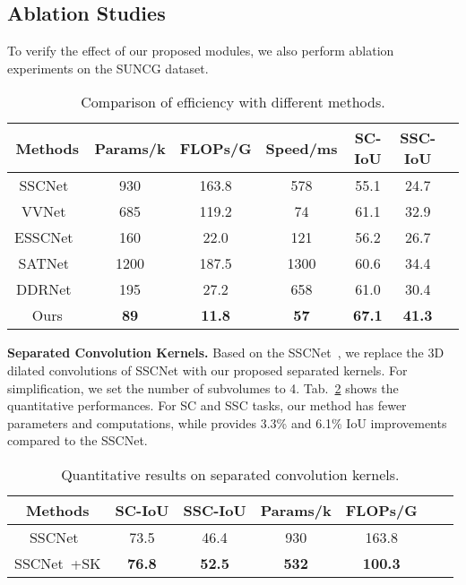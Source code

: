 \documentclass[10pt,twocolumn,letterpaper]{article}
\begin{document}
\subsection{Ablation Studies}
To verify the effect of our proposed modules, we also perform ablation experiments on
the SUNCG dataset.
\begin{table}
\begin{center}
\doublerulesep=0.5pt
\resizebox{0.48\textwidth}{!}
{
\begin{tabular}{|c|c|c|c|c|c|c}
\hline
Methods &Params/k&FLOPs/G&Speed/ms&SC-IoU&SSC-IoU\\
\hline
\hline
SSCNet~\cite{song2017semantic}&930&163.8&578& 55.1& 24.7 \\
VVNet~\cite{guo2018view}&685&119.2&74& 61.1& 32.9\\
ESSCNet~\cite{zhang2018efficient}&160&22.0&121& 56.2&26.7\\
SATNet~\cite{liu2018see}&1200&187.5&1300& 60.6& 34.4\\
DDRNet~\cite{li2019rgbd}&195&27.2&658& 61.0& 30.4\\
Ours&\textbf{89}&\textbf{11.8}&\textbf{57}& \textbf{67.1}& \textbf{41.3}\\
\hline
\end{tabular}
}
\caption{Comparison of efficiency with different methods.}
\label{table:computation}
\vspace{-4mm}
\end{center}
\end{table}

\textbf{Separated Convolution Kernels.}
Based on the SSCNet~\cite{song2017semantic}, we replace the 3D dilated convolutions of SSCNet with our proposed separated kernels.
For simplification, we set the number of subvolumes to 4.
Tab.~\ref{table:sk} shows the quantitative performances.
For SC and SSC tasks, our method has fewer parameters and computations, while provides 3.3\% and 6.1\% IoU improvements compared to the SSCNet.
\begin{table}
\begin{center}
\doublerulesep=0.5pt
\resizebox{0.48\textwidth}{!}
{
\begin{tabular}{|c|c|c|c|c|cc}
\hline
Methods &SC-IoU&SSC-IoU&Params/k&FLOPs/G\\
\hline
\hline
SSCNet~\cite{song2017semantic}&73.5& 46.4& 930& 163.8\\
SSCNet~\cite{song2017semantic}+SK&\textbf{76.8}&\textbf{52.5}&\textbf{532}&\textbf{100.3}\\
\hline
\end{tabular}
}
\caption{Quantitative results on separated convolution kernels.}
\label{table:sk}
\vspace{-6mm}
\end{center}
\end{table}
\end{document}
